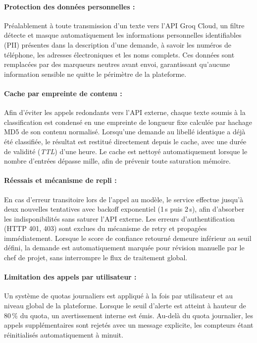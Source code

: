 \paragraph{Protection des données personnelles :}
Préalablement à toute transmission d'un texte vers l'API Groq Cloud,
un filtre détecte et masque automatiquement les informations
personnelles identifiables (PII) présentes dans la description d'une
demande, à savoir les numéros de téléphone, les adresses
électroniques et les noms complets. Ces données sont remplacées par
des marqueurs neutres avant envoi, garantissant qu'aucune information
sensible ne quitte le périmètre de la plateforme.

\paragraph{Cache par empreinte de contenu :}
Afin d'éviter les appels redondants vers l'API externe, chaque texte
soumis à la classification est condensé en une empreinte de longueur
fixe calculée par hachage MD5 de son contenu normalisé. Lorsqu'une
demande au libellé identique a déjà été classifiée, le résultat est
restitué directement depuis le cache, avec une durée de validité
(\textit{TTL}) d'une heure. Le cache est nettoyé automatiquement
lorsque le nombre d'entrées dépasse mille, afin de prévenir toute
saturation mémoire.

\paragraph{Réessais et mécanisme de repli :}
En cas d'erreur transitoire lors de l'appel au modèle, le service
effectue jusqu'à deux nouvelles tentatives avec backoff exponentiel
(1\,s puis 2\,s), afin d'absorber les indisponibilités sans saturer
l'API externe. Les erreurs d'authentification (HTTP 401, 403) sont
exclues du mécanisme de retry et propagées immédiatement. Lorsque
le score de confiance retourné demeure inférieur au seuil défini,
la demande est automatiquement marquée pour révision manuelle par
le chef de projet, sans interrompre le flux de traitement global.

\paragraph{Limitation des appels par utilisateur :}
Un système de quotas journaliers est appliqué à la fois par
utilisateur et au niveau global de la plateforme. Lorsque le seuil
d'alerte est atteint à hauteur de 80\,\% du quota, un avertissement
interne est émis. Au-delà du quota journalier, les appels
supplémentaires sont rejetés avec un message explicite, les compteurs
étant réinitialisés automatiquement à minuit.

